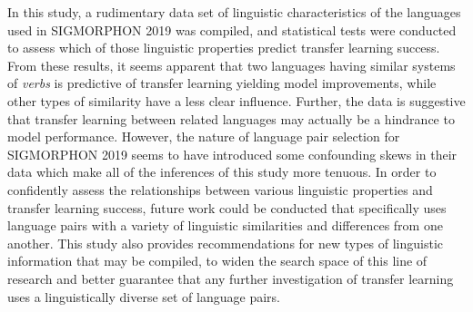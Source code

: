 In this study, a rudimentary data set of linguistic characteristics of the languages used in SIGMORPHON 2019 was compiled, and statistical tests were conducted to assess which of those linguistic properties predict transfer learning success. From these results, it seems apparent that two languages having similar systems of \textit{verbs} is predictive of transfer learning yielding model improvements, while other types of similarity have a less clear influence. Further, the data is suggestive that transfer learning between related languages may actually be a hindrance to model performance. However, the nature of language pair selection for SIGMORPHON 2019 seems to have introduced some confounding skews in their data which make all of the inferences of this study more tenuous. In order to confidently assess the relationships between various linguistic properties and transfer learning success, future work could be conducted that specifically uses language pairs with a variety of linguistic similarities and differences from one another. This study also provides recommendations for new types of linguistic information that may be compiled, to widen the search space of this line of research and better guarantee that any further investigation of transfer learning uses a linguistically diverse set of language pairs.
